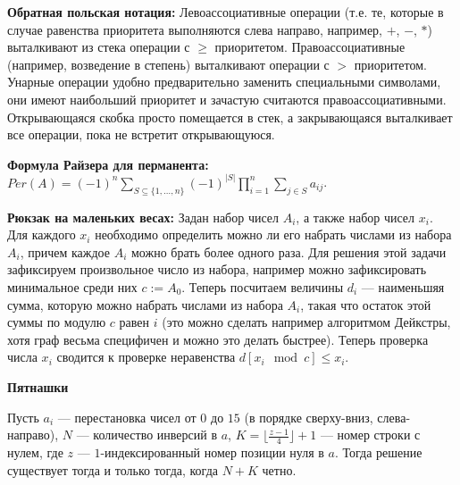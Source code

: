 \textbf{Обратная польская нотация:}
Левоассоциативные операции (т.е. те, которые в случае равенства приоритета выполняются слева направо, например, $+$, $-$, $*$)
выталкивают из стека операции с $\geq$ приоритетом. Правоассоциативные (например, возведение в степень) выталкивают операции
с $>$ приоритетом. Унарные операции удобно предварительно заменить специальными символами, они имеют наибольший приоритет и
зачастую считаются правоассоциативными. Открывающаяся скобка просто помещается в стек, а закрывающаяся выталкивает все
операции, пока не встретит открывающуюся.

\textbf{Формула Райзера для перманента:}
$Per(A)=(-1)^n\sum\limits_{S\subseteq \{1, \ldots , n\}}(-1)^{|S|}\prod\limits_{i=1}^n\sum\limits_{j\in S}a_{ij}$.

\textbf{Рюкзак на маленьких весах:}
Задан набор чисел $A_i$, а также набор чисел $x_i$. Для каждого $x_i$ необходимо определить можно ли его набрать числами из набора $A_i$, причем каждое $A_i$ можно брать
более одного раза. Для решения этой задачи зафиксируем произвольное число из набора, например можно зафиксировать минимальное среди них  $c := A_0$. Теперь посчитаем величины
$d_i$ --- наименьшяя сумма, которую можно набрать числами из набора $A_i$, такая что остаток этой суммы по модулю $c$ равен $i$ (это можно сделать например алгоритмом
Дейкстры, хотя граф весьма специфичен и можно это делать быстрее). Теперь проверка числа $x_i$ сводится к проверке неравенства $d[x_i \mod c] \le x_i$.

\textbf{Пятнашки}

Пусть $a_i$ --- перестановка чисел от $0$ до $15$ (в порядке сверху-вниз, слева-направо),
$N$ --- количество инверсий в $a$, $K = \lfloor\frac{z - 1}4\rfloor + 1$ --- номер строки с нулем,
где $z$ --- $1$-индексированный номер позиции нуля в $a$. Тогда решение существует тогда и только
тогда, когда $N + K$ четно.


